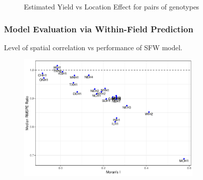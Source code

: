 \documentclass{beamer}
\begin{document}
\begin{frame}
\begin{figure}[H]
  \caption{Estimated Yield vs Location Effect for pairs of genotypes}
\end{figure}




\end{frame}



\begin{frame}
	\frametitle{Model Evaluation via Within-Field Prediction}
Level of spatial correlation vs performance of SFW model.

	\begin{figure}[H]
		\centering
		\includegraphics[width = 0.8\textwidth]{morans_i.pdf}
	\end{figure}
\end{frame}
\end{document}
